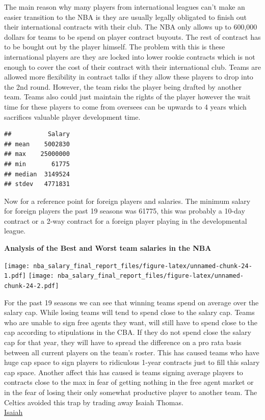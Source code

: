 \documentclass[]{article}
\begin{document}
The main reason why many players from international leagues can't make
an easier transition to the NBA is they are usually legally obligated to
finish out their international contracts with their club. The NBA only
allows up to 600,000 dollars for teams to be spend on player contract
buyouts. The rest of contract has to be bought out by the player
himself. The problem with this is these international players are they
are locked into lower rookie contracts which is not enough to cover the
cost of their contract with their international club. Teams are allowed
more flexibility in contract talks if they allow these players to drop
into the 2nd round. However, the team risks the player being drafted by
another team. Teams also could just maintain the rights of the player
however the wait time for these players to come from oversees can be
upwards to 4 years which sacrifices valuable player development time.

\begin{verbatim}
##          Salary
## mean    5002830
## max    25000000
## min       61775
## median  3149524
## stdev   4771831
\end{verbatim}

Now for a reference point for foreign players and salaries. The minimum
salary for foreign players the past 19 seasons was 61775, this was
probably a 10-day contract or a 2-way contract for a foreign player
playing in the developmental league.

\textbf{Analysis of the Best and Worst team salaries in the NBA}

\texttt{[image: nba\_salary\_final\_report\_files/figure-latex/unnamed-chunk-24-1.pdf]}
\texttt{[image: nba\_salary\_final\_report\_files/figure-latex/unnamed-chunk-24-2.pdf]}

For the past 19 seasons we can see that winning teams spend on average
over the salary cap. While losing teams will tend to spend close to the
salary cap. Teams who are unable to sign free agents they want, will
still have to spend close to the cap according to stipulations in the
CBA. If they do not spend close the salary cap for that year, they will
have to spread the difference on a pro rata basis between all current
players on the team's roster. This has caused teams who have huge cap
space to sign players to ridiculous 1-year contracts just to fill this
salary cap space. Another affect this has caused is teams signing
average players to contracts close to the max in fear of getting nothing
in the free agent market or in the fear of losing their only somewhat
productive player to another team. The Celtics avoided this trap by
trading away Isaiah Thomas.\\
\href{https://nesn.com/2018/07/why-nba-insider-believes-isaiah-thomas-never-had-shot-at-max-contract/}{Isaiah}
\end{document}
